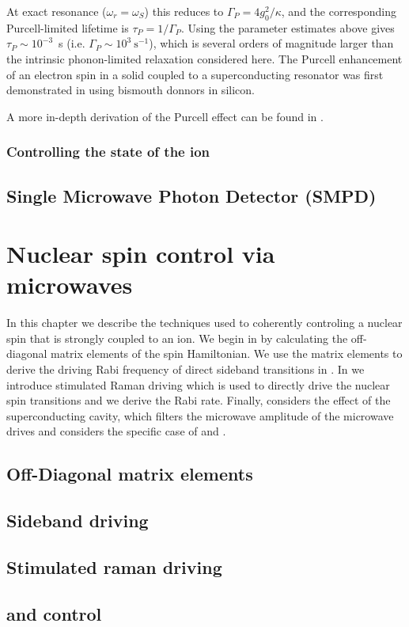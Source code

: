 At exact resonance ($\omega_r=\omega_S$) this reduces to $\Gamma_{P}=4g_0^2/\kappa$, and the corresponding Purcell-limited lifetime is $\tau_P = 1/\Gamma_{P}$. Using the parameter estimates above gives $\tau_P\sim10^{-3}$~s (i.e. $\Gamma_P\sim10^3\ \mathrm{s}^{-1}$), which is several orders of magnitude larger than the intrinsic phonon-limited relaxation considered here. The Purcell enhancement of an electron spin in a solid coupled to a superconducting resonator was first demonstrated in  using bismouth donnors in silicon.

A more in-depth derivation of the Purcell effect can be found in .

\subsection{Controlling the state of the \Er ion}

\section{Single Microwave Photon Detector (SMPD)}

\setchapterpreamble[u]{\margintoc}
\chapter{Nuclear spin control via microwaves}

In this chapter we describe the techniques used to coherently controling a nuclear spin that is strongly coupled to an \Er ion. We begin in  by calculating the off-diagonal matrix elements of the spin Hamiltonian. We use the matrix elements to derive the driving Rabi frequency of direct sideband transitions in . In  we introduce stimulated Raman driving which is used to directly drive the nuclear spin transitions and we derive the Rabi rate. Finally,  considers the effect of the superconducting cavity, which filters the microwave amplitude of the microwave drives and considers the specific case of \W and \Nb. 

\section{Off-Diagonal matrix elements}

\section{Sideband driving}

\section{Stimulated raman driving}

\section[183W and 93Nb control]{\W and \Nb control}

